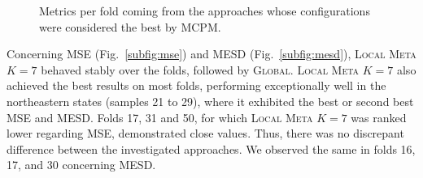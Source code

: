 \documentclass[runningheads]{llncs}
\begin{document}
\begin{figure}[!ht]
    \centering
    \qquad
    \qquad
    \caption{Metrics per fold coming from the approaches whose configurations were considered the best by MCPM.}
    \label{fig:statistics_per_fold}
\end{figure}

Concerning MSE (Fig.~\ref{subfig:mse}) and MESD (Fig.~\ref{subfig:mesd}), \textsc{Local Meta $K=7$} behaved stably over the folds, followed by \textsc{Global}. \textsc{Local Meta $K=7$} also achieved the best results on most folds, performing exceptionally well in the northeastern states (samples 21 to 29), where it exhibited the best or second best MSE and MESD. Folds 17, 31 and 50, for which \textsc{Local Meta $K=7$} was ranked lower regarding MSE, demonstrated close values. Thus, there was no discrepant difference between the investigated approaches. We observed the same in folds 16, 17, and 30 concerning MESD.
\end{document}
